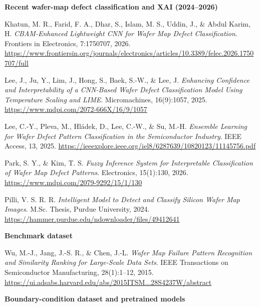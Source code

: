 \documentclass[11pt,a4paper]{article}
\begin{document}
\textbf{Recent wafer-map defect classification and XAI (2024--2026)}

\begin{list}{}{\setlength{\leftmargin}{2.5em}\setlength{\labelwidth}{2em}\setlength{\labelsep}{0.3em}\setlength{\itemsep}{0.2ex}}
\item[13.] Khatun, M. R., Farid, F. A., Dhar, S., Islam, M. S., Uddin, J., \& Abdul Karim, H. \emph{CBAM-Enhanced Lightweight CNN for Wafer Map Defect Classification}. Frontiers in Electronics, 7:1750707, 2026. \url{https://www.frontiersin.org/journals/electronics/articles/10.3389/felec.2026.1750707/full}
\item[14.] Lee, J., Ju, Y., Lim, J., Hong, S., Baek, S.-W., \& Lee, J. \emph{Enhancing Confidence and Interpretability of a CNN-Based Wafer Defect Classification Model Using Temperature Scaling and LIME}. Micromachines, 16(9):1057, 2025. \url{https://www.mdpi.com/2072-666X/16/9/1057}
\item[15.] Lee, C.-Y., Pleva, M., Hl\'adek, D., Lee, C.-W., \& Su, M.-H. \emph{Ensemble Learning for Wafer Defect Pattern Classification in the Semiconductor Industry}. IEEE Access, 13, 2025. \url{https://ieeexplore.ieee.org/iel8/6287639/10820123/11145756.pdf}
\item[16.] Park, S. Y., \& Kim, T. S. \emph{Fuzzy Inference System for Interpretable Classification of Wafer Map Defect Patterns}. Electronics, 15(1):130, 2026. \url{https://www.mdpi.com/2079-9292/15/1/130}
\item[17.] Pilli, V. S. R. R. \emph{Intelligent Model to Detect and Classify Silicon Wafer Map Images}. M.Sc. Thesis, Purdue University, 2024. \url{https://hammer.purdue.edu/ndownloader/files/49412641}
\end{list}

\textbf{Benchmark dataset}

\begin{list}{}{\setlength{\leftmargin}{2.5em}\setlength{\labelwidth}{2em}\setlength{\labelsep}{0.3em}\setlength{\itemsep}{0.2ex}}
\item[18.] Wu, M.-J., Jang, J.-S. R., \& Chen, J.-L. \emph{Wafer Map Failure Pattern Recognition and Similarity Ranking for Large-Scale Data Sets}. IEEE Transactions on Semiconductor Manufacturing, 28(1):1--12, 2015. \url{https://ui.adsabs.harvard.edu/abs/2015ITSM...28S4237W/abstract}
\end{list}

\textbf{Boundary-condition dataset and pretrained models}
\end{document}
